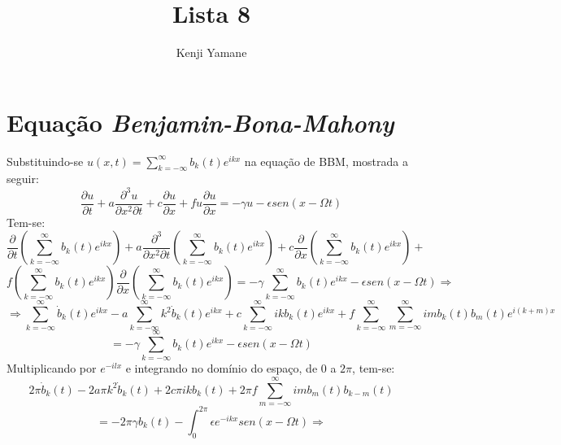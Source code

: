 \documentclass{article}[twocolumn]
\title{Lista 8}
\author{Kenji Yamane}
\begin{document}
	\maketitle
	\section{Equa\c{c}\~ao \textit{Benjamin-Bona-Mahony}}
	Substituindo-se $u(x, t) = \sum_{k = -\infty}^{\infty} b_k(t)e^{ikx}$ na equa\c{c}\~ao
	de BBM, mostrada a seguir:
	\begin{equation}
		\frac{\partial u}{\partial t} + a\frac{\partial^3 u}{\partial x^2\partial t} + c\frac{\partial u}{\partial x}
		+ fu\frac{\partial u}{\partial x} = -\gamma u - \epsilon sen(x - \Omega t)
		\nonumber
	\end{equation}
	Tem-se:
	\begin{equation}
		\frac{\partial}{\partial t}\left(\sum_{k = -\infty}^{\infty} b_k(t)e^{ikx}\right) +
		a\frac{\partial^3}{\partial x^2\partial t}\left(\sum_{k = -\infty}^{\infty} b_k(t)e^{ikx}\right) +
		c\frac{\partial}{\partial x}\left(\sum_{k = -\infty}^{\infty} b_k(t)e^{ikx}\right) +
		\nonumber
	\end{equation}
	\begin{equation}
		f\left(\sum_{k = -\infty}^{\infty} b_k(t)e^{ikx}\right)\frac{\partial}{\partial x}\left(\sum_{k = -\infty}^{\infty} b_k(t)e^{ikx}\right)
		= -\gamma \sum_{k = -\infty}^{\infty} b_k(t)e^{ikx} - \epsilon sen(x - \Omega t) \Rightarrow
		\nonumber
	\end{equation}
	\begin{equation}
		\Rightarrow \sum_{k = -\infty}^{\infty} \dot{b}_k(t)e^{ikx} -
		a\sum_{k = -\infty}^{\infty} k^2\dot{b}_k(t)e^{ikx} +
		c\sum_{k = -\infty}^{\infty} ikb_k(t)e^{ikx} +
		f\sum_{k = -\infty}^{\infty}\sum_{m = -\infty}^{\infty} imb_k(t)b_m(t)e^{i(k + m)x}
		\nonumber
	\end{equation}
	\begin{equation}
		= -\gamma \sum_{k = -\infty}^{\infty} b_k(t)e^{ikx} - \epsilon sen(x - \Omega t)
		\nonumber
	\end{equation}
	Multiplicando por $e^{-ilx}$ e integrando no dom\'inio do espa\c{c}o, de 0 a $2\pi$, tem-se:
	\begin{equation}
		2\pi \dot{b}_k(t) - 2a\pi k^2\dot{b}_k(t) + 2c\pi ikb_k(t) + 2\pi f\sum_{m = -\infty}^{\infty} imb_m(t)b_{k - m}(t)
		\nonumber
	\end{equation}
	\begin{equation}
		= -2\pi\gamma b_k(t) - \int_0^{2\pi}\epsilon e^{-ikx}sen(x - \Omega t) \Rightarrow
		\nonumber
	\end{equation}
\end{document}
